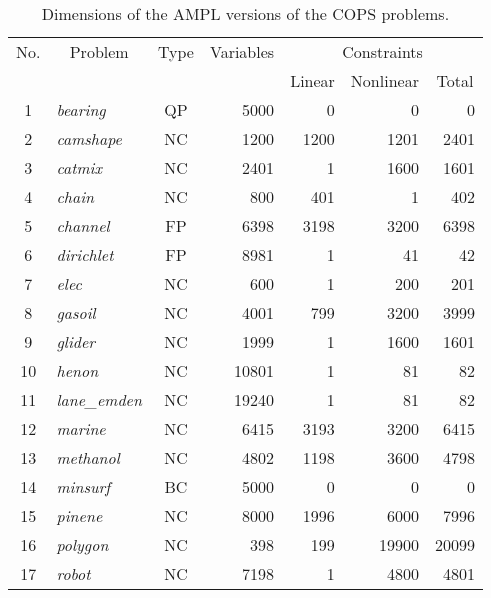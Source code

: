 \documentclass[draft,leqno,onefignum,onetabnum]{siamltex}
\def\strut{\rule[-1.25ex]{0pt}{4ex}}%
\def\strutu{\rule{0pt}{3ex}}%
\def\AMPL  {{\small AMPL}}
\def\COPS  {{\small COPS}}
\def\Cute#1{\hbox{\it\lowercase{#1}\/}}
\begin{document}
\begin{table}[t]
\caption{Dimensions of the \AMPL{} versions of the \COPS{} problems.}
\label{table_COPS-dims}
\begin{center} \footnotesize
\begin{tabular}{|c|l|c|r|r|r|r|}\hline
 \multicolumn{1}{|c|}{\strut No.}&
 \multicolumn{1}{|c|}{Problem}&
 \multicolumn{1}{c|}{Type}&
 \multicolumn{1}{c|}{Variables}&
 \multicolumn{3}{c|}{Constraints}\\\cline{5-7}
 \multicolumn{1}{|c|}{\strut }&
 \multicolumn{1}{|c|}{ }&
 \multicolumn{1}{c|}{  }&
 \multicolumn{1}{c|}{  }&
 \multicolumn{1}{c|}{Linear}&
 \multicolumn{1}{c|}{Nonlinear}&
 \multicolumn{1}{c|}{Total}
\\\hline\strutu 1&\Cute{bearing}    & QP & 5000 &     0 &      0 &     0
\\              2&\Cute{camshape}   & NC & 1200 &  1200 &   1201 &  2401
\\              3&\Cute{catmix}     & NC & 2401 &     1 &   1600 &  1601
\\              4&\Cute{chain}      & NC &  800 &   401 &      1 &   402
\\              5&\Cute{channel}    & FP & 6398 &  3198 &   3200 &  6398
\\              6&\Cute{dirichlet}  & FP & 8981 &     1 &     41 &    42
\\              7&\Cute{elec}       & NC &  600 &     1 &    200 &   201
\\              8&\Cute{gasoil}     & NC & 4001 &   799 &   3200 &  3999
\\              9&\Cute{glider}     & NC & 1999 &     1 &   1600 &  1601
\\             10&\Cute{henon}      & NC &10801 &     1 &     81 &    82
\\             11&\Cute{lane\_emden}& NC &19240 &     1 &     81 &    82
\\             12&\Cute{marine}     & NC & 6415 &  3193 &   3200 &  6415
\\             13&\Cute{methanol}   & NC & 4802 &  1198 &   3600 &  4798
\\             14&\Cute{minsurf}    & BC & 5000 &     0 &      0 &     0
\\             15&\Cute{pinene}     & NC & 8000 &  1996 &   6000 &  7996
\\             16&\Cute{polygon}    & NC &  398 &   199 &  19900 & 20099
\\             17&\Cute{robot}      & NC & 7198 &     1 &   4800 &  4801

\end{tabular}
\end{center}
\end{table}
\end{document}
